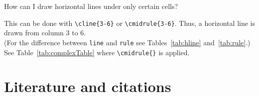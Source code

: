 \begin{QandA}
\item How can I draw horizontal lines under only certain cells?

	\begin{answered}
		
		This can be done with \verb|\cline{3-6}| or \verb|\cmidrule{3-6}|. Thus, a horizontal line is drawn from column 3 to 6. \\
		(For the difference between \texttt{line} and \texttt{rule} see Tables~\ref{tab:hline} and~\ref{tab:rule}.) \\
		See Table~\ref{tab:complexTable} where \verb|\cmidrule{}| is applied.
		
	\end{answered}

\end{QandA}






\section{Literature and citations}
\label{sec:Literature}

